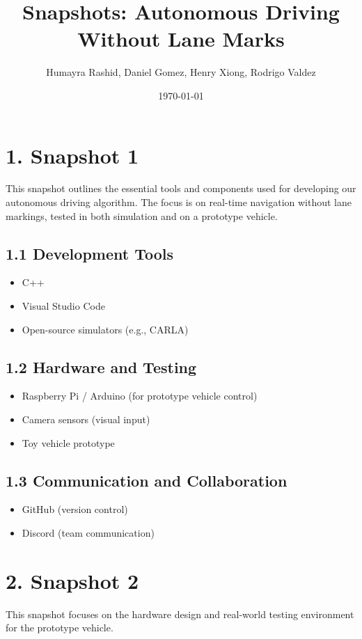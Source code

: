 \documentclass[8pt]{article}
\title{Snapshots: Autonomous Driving Without Lane Marks}
\author{Humayra Rashid, Daniel Gomez, Henry Xiong, Rodrigo Valdez}
\date{\today}
\begin{document}
\maketitle
\section*{1. Snapshot 1}
This snapshot outlines the essential tools and components used for developing our autonomous driving algorithm. The focus is on real-time navigation without lane markings, tested in both simulation and on a prototype vehicle.

\subsection*{1.1 Development Tools}
\begin{itemize}[label=\textbullet]
  \item C++
  \item Visual Studio Code
  \item Open-source simulators (e.g., CARLA)
\end{itemize}

\subsection*{1.2 Hardware and Testing}
\begin{itemize}[label=\textbullet]
  \item Raspberry Pi / Arduino (for prototype vehicle control)
  \item Camera sensors (visual input)
  \item Toy vehicle prototype
\end{itemize}

\subsection*{1.3 Communication and Collaboration}
\begin{itemize}[label=\textbullet]
  \item GitHub (version control)
  \item Discord (team communication)
\end{itemize}

\section*{2. Snapshot 2}
This snapshot focuses on the hardware design and real-world testing environment for the prototype vehicle.
\end{document}
